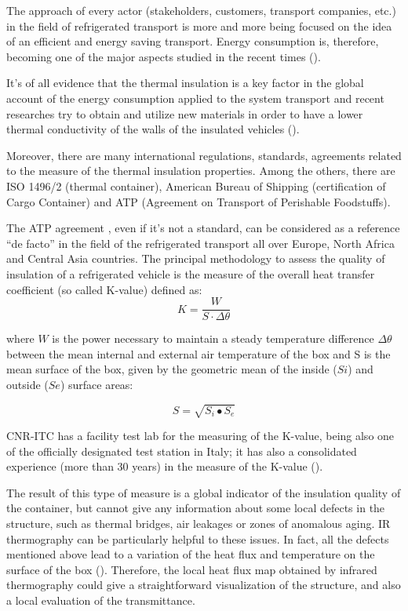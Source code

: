 \documentclass{tQRT2e}
\begin{document}
The approach of every actor (stakeholders, customers, transport companies, etc.) in the field of refrigerated transport is more and more being focused on the idea of an efficient and energy saving transport. Energy consumption is, therefore, becoming one of the major aspects studied in the recent times (\cite{Tassou2009,Cavalier2010,Adekomaya2017}). 

It’s of all evidence that the thermal insulation is a key factor in the global account of the energy consumption applied to the system transport and recent researches try to obtain and utilize new materials in order to have a lower thermal conductivity of the walls of the insulated vehicles (\cite{Tinti2014,Lawton2016}).

Moreover, there are many international regulations, standards, agreements related to the measure of the thermal insulation properties. Among the others, there are ISO 1496/2 (thermal container), American Bureau of Shipping (certification of Cargo Container) and ATP (Agreement on Transport of Perishable Foodstuffs).

The ATP agreement \cite{Geneva1970}, even if it’s not a standard, can be considered as a reference “de facto” in the field of the refrigerated transport all over Europe, North Africa and Central Asia countries. The principal methodology to assess the quality of insulation of a refrigerated vehicle is the measure of the overall heat transfer coefficient (so called K-value) defined as:
\begin{equation}
K=\frac{W}{S⋅\Delta \theta}
\end{equation}


where $ W $ is the power necessary to maintain a steady temperature difference $ \Delta \theta $ between the mean internal and external air temperature of the box and S is the mean surface of the box, given by the geometric mean of the inside ($ Si $) and outside ($ Se $) surface areas:

\begin{equation}
S=\sqrt{S_i∙S_e}
\end{equation}

CNR-ITC has a facility test lab for the measuring of the K-value, being also one of the officially designated test station in Italy; it has also a consolidated experience (more than 30 years) in the measure of the K-value (\cite{rossi2009k}).

The result of this type of measure is a global indicator of the insulation quality of the container, but cannot give any information about some local defects in the structure, such as thermal bridges, air leakages or zones of anomalous aging. IR thermography can be particularly helpful to these issues. In fact, all the defects mentioned above lead to a variation of the heat flux and temperature on the surface of the box (\cite{grinzato2010r, grinzatoquality, grinzato1comparison}). Therefore, the local heat flux map obtained by infrared thermography could give a straightforward visualization of the structure, and also a local evaluation of the transmittance.
\end{document}

